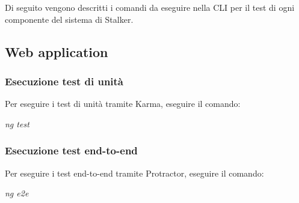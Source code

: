 \documentclass[../manuale-manutentore.tex]{subfiles}
\begin{document}
Di seguito vengono descritti i comandi da eseguire nella CLI per il test di ogni componente del sistema di Stalker.


\subsection{Web application}%
\label{sub:}

\subsubsection{Esecuzione test di unità}%
\label{subs:esecuzione_test_di_unita}

Per eseguire i test di unità tramite Karma, eseguire il comando: \par\bigskip

\begin{center}
  \textit{ng test}
\end{center}
\par\bigskip

\subsubsection{Esecuzione test end-to-end}%
\label{subs:esecuzione_test_end_to_end}

Per eseguire i test end-to-end tramite Protractor, eseguire il comando: \par\bigskip

\begin{center}
  \textit{ng e2e}
\end{center}
\par\bigskip

\end{document}
